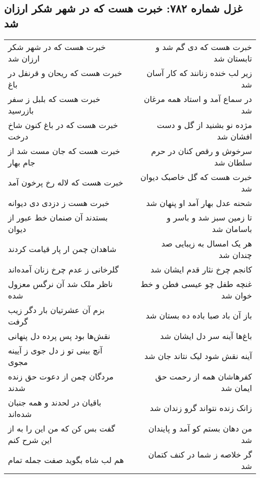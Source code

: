 \begin{center}
\section*{غزل شماره ۷۸۲: خبرت هست که در شهر شکر ارزان شد}
\label{sec:0782}
\begin{longtable}{l p{0.5cm} r}
خبرت هست که در شهر شکر ارزان شد
&&
خبرت هست که دی گم شد و تابستان شد
\\
خبرت هست که ریحان و قرنفل در باغ
&&
زیر لب خنده زنانند که کار آسان شد
\\
خبرت هست که بلبل ز سفر بازرسید
&&
در سماع آمد و استاد همه مرغان شد
\\
خبرت هست که در باغ کنون شاخ درخت
&&
مژده نو بشنید از گل و دست افشان شد
\\
خبرت هست که جان مست شد از جام بهار
&&
سرخوش و رقص کنان در حرم سلطان شد
\\
خبرت هست که لاله رخ پرخون آمد
&&
خبرت هست که گل خاصبک دیوان شد
\\
خبرت هست ز دزدی دی دیوانه
&&
شحنه عدل بهار آمد او پنهان شد
\\
بستدند آن صنمان خط عبور از دیوان
&&
تا زمین سبز شد و باسر و باسامان شد
\\
شاهدان چمن ار پار قیامت کردند
&&
هر یک امسال به زیبایی صد چندان شد
\\
گلرخانی ز عدم چرخ زنان آمده‌اند
&&
کانجم چرخ نثار قدم ایشان شد
\\
ناظر ملک شد آن نرگس معزول شده
&&
غنچه طفل چو عیسی فطن و خط خوان شد
\\
بزم آن عشرتیان بار دگر زیب گرفت
&&
باز آن باد صبا باده ده بستان شد
\\
نقش‌ها بود پس پرده دل پنهانی
&&
باغ‌ها آینه سر دل ایشان شد
\\
آنچ بینی تو ز دل جوی ز آیینه مجوی
&&
آینه نقش شود لیک نتاند جان شد
\\
مردگان چمن از دعوت حق زنده شدند
&&
کفرهاشان همه از رحمت حق ایمان شد
\\
باقیان در لحدند و همه جنبان شده‌اند
&&
زانک زنده نتواند گرو زندان شد
\\
گفت بس کن که من این را به از این شرح کنم
&&
من دهان بستم کو آمد و پایندان شد
\\
هم لب شاه بگوید صفت جمله تمام
&&
گر خلاصه ز شما در کنف کتمان شد
\\
\end{longtable}
\end{center}
